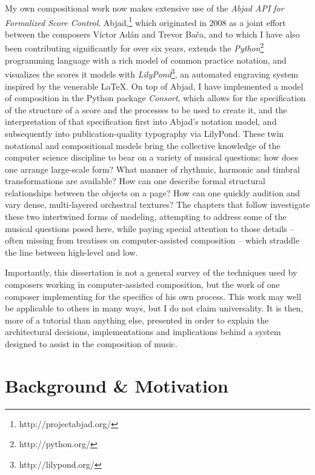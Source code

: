 My own compositional work now makes extensive use of the \emph{Abjad API for
Formalized Score Control}.\citep{baca2011xi, baca2015tenor,
trevino2013compositional} Abjad,\footnote{http://projectabjad.org/} which
originated in 2008 as a joint effort between the composers V\'{i}ctor Ad\'{a}n
and Trevor Ba\v{c}a, and to which I have also been contributing significantly
for over six years, extends the
\emph{Python}\citep{vanrossum2003ys}\footnote{http://python.org/} programming
language with a rich model of common practice notation, and visualizes the
scores it models with
\emph{LilyPond}\citep{nienhuys2003ve}\footnote{http://lilypond.org/}, an
automated engraving system inspired by the venerable \LaTeX{}. On top of Abjad,
I have implemented a model of composition in the Python package \emph{Consort},
which allows for the specification of the structure of a score and the
processes to be used to create it, and the interpretation of that specification
first into Abjad's notation model, and subsequently into publication-quality
typography via LilyPond. These twin notational and compositional models bring
the collective knowledge of the computer science discipline to bear on a
variety of musical questions: how does one arrange large-scale form? What
manner of rhythmic, harmonic and timbral transformations are available? How can
one describe formal structural relationships between the objects on a page? How
can one quickly audition and vary dense, multi-layered orchestral textures? The
chapters that follow investigate these two intertwined forms of modeling,
attempting to address some of the musical questions posed here, while paying
special attention to those details -- often missing from treatises on
computer-assisted composition -- which straddle the line between high-level and
low.

Importantly, this dissertation is not a general survey of the techniques used
by composers working in computer-assisted composition, but the work of one
composer implementing for the specifics of his own process. This work may well
be applicable to others in many ways, but I do not claim universality. It is
then, more of a tutorial than anything else, presented in order to explain the
architectural decisions, implementations and implications behind a system
designed to assist in the composition of music.

\section{Background \& Motivation}
\label{sec:background-and-motivation}

